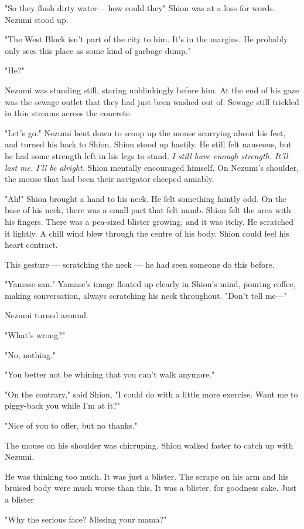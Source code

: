 "So they flush dirty water--- how could they\el " Shion was at a loss for
words. Nezumi stood up.

"The West Block isn't part of the city to him. It's in the margins. He
probably only sees this place as some kind of garbage dump."

"He?"

Nezumi was standing still, staring unblinkingly before him. At the end
of his gaze was the sewage outlet that they had just been washed out of.
Sewage still trickled in thin streams across the concrete.

"Let's go." Nezumi bent down to scoop up the mouse scurrying about his
feet, and turned his back to Shion. Shion stood up hastily. He still
felt nauseous, but he had some strength left in his legs to stand. \emph{I
still have enough strength. It'll last me. I'll be alright.} Shion
mentally encouraged himself. On Nezumi's shoulder, the mouse that had
been their navigator cheeped amiably.

"Ah!" Shion brought a hand to his neck. He felt something faintly odd.
On the base of his neck, there was a small part that felt numb. Shion
felt the area with his fingers. There was a pea-sized blister growing,
and it was itchy. He scratched it lightly. A chill wind blew through the
centre of his body. Shion could feel his heart contract.

This gesture --- scratching the neck --- he had seen someone do this before.

"Yamase-san." Yamase's image floated up clearly in Shion's mind, pouring
coffee, making conversation, always scratching his neck throughout.
"Don't tell me---"

Nezumi turned around.

"What's wrong?"

"No, nothing."

"You better not be whining that you can't walk anymore."

"On the contrary," said Shion, "I could do with a little more exercise.
Want me to piggy-back you while I'm at it?"

"Nice of you to offer, but no thanks."

The mouse on his shoulder was chirruping. Shion walked faster to catch
up with Nezumi.

He was thinking too much. It was just a blister. The scrape on his arm
and his bruised body were much worse than this. It was a blister, for
goodness sake. Just a blister\el 

"Why the serious face? Missing your mama?"

